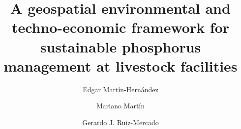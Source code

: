 \documentclass[authoryear]{elsarticle}
\begin{document}
\begin{frontmatter}
\title{A geospatial environmental and techno-economic framework for sustainable phosphorus management at livestock facilities}

%
%
%
%
%
%

\author[ORISE,Salamanca]{Edgar Mart\'{i}n-Hern\'{a}ndez}
\author[Salamanca]{Mariano Mart\'{i}n}
\author[EPA]{Gerardo J. Ruiz-Mercado}

\address[ORISE]{Oak Ridge Institute for Science and Education, hosted by Office of Research \& Development, US Environmental Protection Agency, 26 West Martin Luther King Drive, Cincinnati, Ohio 45268, United States}
\address[Salamanca]{Department of Chemical Engineering, University of Salamanca, Plza. Ca\'{i}dos 1-5, 37008 Salamanca, Spain}
\address[EPA]{Center for Environmental Solutions and Emergency Response (CESER), US Environmental Protection Agency, 26 West Martin Luther King Drive, Cincinnati, Ohio 45268, United States}


\end{frontmatter}
\end{document}
